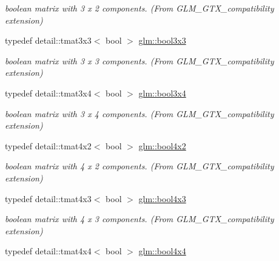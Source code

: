 \begin{DoxyCompactItemize}
\begin{DoxyCompactList}\small\item\em boolean matrix with 3 x 2 components. (From G\+L\+M\+\_\+\+G\+T\+X\+\_\+compatibility extension) \end{DoxyCompactList}\item 
\hypertarget{group__gtx__compatibility_ga38aea6ef5e223852a21b23cba4492a23}{}typedef detail\+::tmat3x3$<$ bool $>$ \hyperlink{group__gtx__compatibility_ga38aea6ef5e223852a21b23cba4492a23}{glm\+::bool3x3}\label{group__gtx__compatibility_ga38aea6ef5e223852a21b23cba4492a23}

\begin{DoxyCompactList}\small\item\em boolean matrix with 3 x 3 components. (From G\+L\+M\+\_\+\+G\+T\+X\+\_\+compatibility extension) \end{DoxyCompactList}\item 
\hypertarget{group__gtx__compatibility_ga5f0786d9adf716d8341c1f640fef0ceb}{}typedef detail\+::tmat3x4$<$ bool $>$ \hyperlink{group__gtx__compatibility_ga5f0786d9adf716d8341c1f640fef0ceb}{glm\+::bool3x4}\label{group__gtx__compatibility_ga5f0786d9adf716d8341c1f640fef0ceb}

\begin{DoxyCompactList}\small\item\em boolean matrix with 3 x 4 components. (From G\+L\+M\+\_\+\+G\+T\+X\+\_\+compatibility extension) \end{DoxyCompactList}\item 
\hypertarget{group__gtx__compatibility_gadc7c61e23e3f075e8b8b072b61f283db}{}typedef detail\+::tmat4x2$<$ bool $>$ \hyperlink{group__gtx__compatibility_gadc7c61e23e3f075e8b8b072b61f283db}{glm\+::bool4x2}\label{group__gtx__compatibility_gadc7c61e23e3f075e8b8b072b61f283db}

\begin{DoxyCompactList}\small\item\em boolean matrix with 4 x 2 components. (From G\+L\+M\+\_\+\+G\+T\+X\+\_\+compatibility extension) \end{DoxyCompactList}\item 
\hypertarget{group__gtx__compatibility_ga415cad4b98bd163cc026c158eff4fdf1}{}typedef detail\+::tmat4x3$<$ bool $>$ \hyperlink{group__gtx__compatibility_ga415cad4b98bd163cc026c158eff4fdf1}{glm\+::bool4x3}\label{group__gtx__compatibility_ga415cad4b98bd163cc026c158eff4fdf1}

\begin{DoxyCompactList}\small\item\em boolean matrix with 4 x 3 components. (From G\+L\+M\+\_\+\+G\+T\+X\+\_\+compatibility extension) \end{DoxyCompactList}\item 
\hypertarget{group__gtx__compatibility_ga948bd65d1900f4eb4ba2a98d8507989a}{}typedef detail\+::tmat4x4$<$ bool $>$ \hyperlink{group__gtx__compatibility_ga948bd65d1900f4eb4ba2a98d8507989a}{glm\+::bool4x4}\label{group__gtx__compatibility_ga948bd65d1900f4eb4ba2a98d8507989a}


\end{DoxyCompactItemize}
